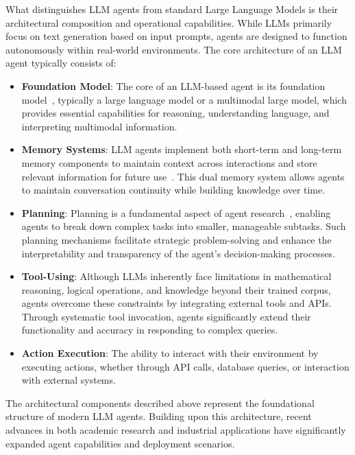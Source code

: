 \documentclass[10pt,preprint]{article}
\begin{document}
What distinguishes LLM agents from standard Large Language Models is their architectural composition and operational capabilities. While LLMs primarily focus on text generation based on input prompts, agents are designed to function autonomously within real-world environments. The core architecture of an LLM agent typically consists of:
\begin{itemize}
    \item \textbf{Foundation Model}: 
    The core of an LLM-based agent is its foundation model~\citep{zhao2025surveylargelanguagemodels,Yin_2024}, typically a large language model or a multimodal large model, which provides essential capabilities for reasoning, understanding language, and interpreting multimodal information.
    \item \textbf{Memory Systems}: LLM agents implement both short-term and long-term memory components to maintain context across interactions and store relevant information for future use~\citep{zhang2024surveymemorymechanismlarge,yang2025agentnetdecentralizedevolutionarycoordination}. This dual memory system allows agents to maintain conversation continuity while building knowledge over time.
    \item \textbf{Planning}: Planning is a fundamental aspect of agent research~\citep{}, enabling agents to break down complex tasks into smaller, manageable subtasks. Such planning mechanisms facilitate strategic problem-solving and enhance the interpretability and transparency of the agent's decision-making processes.
    \item \textbf{Tool-Using}: 
    Although LLMs inherently face limitations in mathematical reasoning, logical operations, and knowledge beyond their trained corpus, agents overcome these constraints by integrating external tools and APIs\cite{wang2023toolllm,schick2023toolformerlanguagemodelsteach,Qu_2025,liu2024apigenautomatedpipelinegenerating}. Through systematic tool invocation, agents significantly extend their functionality and accuracy in responding to complex queries.
    \item \textbf{Action Execution}: The ability to interact with their environment by executing actions\cite{liu2023agentbench,yang2025whosmvpgametheoreticevaluation}, whether through API calls, database queries, or interaction with external systems.
\end{itemize}

The architectural components described above represent the foundational structure of modern LLM agents.  Building upon this architecture, recent advances in both academic research and industrial applications have significantly expanded agent capabilities and deployment scenarios.
\end{document}
